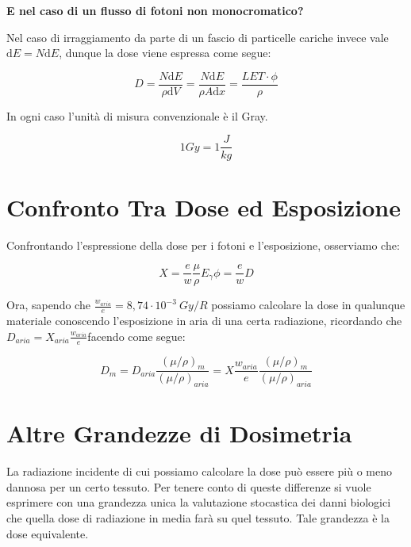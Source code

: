\textbf{E nel caso di un flusso di fotoni non monocromatico?}

Nel caso di irraggiamento da parte di un fascio di particelle cariche invece vale $\mathrm{d}E=N\mathrm{d}E$, dunque la dose viene espressa come segue:

\begin{equation}
D=\frac{N\mathrm{d}E}{\rho \mathrm{d}V}=\frac{N\mathrm{d}E}{\rho A \mathrm{d}x}=\frac{LET\cdot\phi}{\rho}
\end{equation}

In ogni caso l'unità di misura convenzionale è il Gray.

\begin{equation}
1 Gy = 1 \frac{J}{kg}
\end{equation}

\section{Confronto Tra Dose ed Esposizione}

Confrontando l'espressione della dose per i fotoni e l'esposizione, osserviamo che:

\begin{equation}
X=\frac{e}{w}\frac{\mu}{\rho}E_{\gamma}\phi=\frac{e}{w}D
\end{equation}

Ora, sapendo che $\frac{w_{aria}}{e}=8,74\cdot 10^{-3} \ Gy/R$ possiamo calcolare la dose in qualunque materiale conoscendo l'esposizione in aria di una certa radiazione, ricordando che $D_{aria}=X_{aria}\frac{w_{aria}}{e}$facendo come segue:

\begin{equation}
D_{m}=D_{aria}\frac{(\mu/\rho)_m}{(\mu/\rho)_{aria}}=X\frac{w_{aria}}{e}\frac{(\mu/\rho)_m}{(\mu/\rho)_{aria}}
\end{equation}



\section{Altre Grandezze di Dosimetria}

La radiazione incidente di cui possiamo calcolare la dose può essere più o meno dannosa per un certo tessuto. Per tenere conto di queste differenze si vuole esprimere con una grandezza unica la valutazione stocastica dei danni biologici che quella dose di radiazione in media farà su quel tessuto. Tale grandezza è la dose equivalente.


